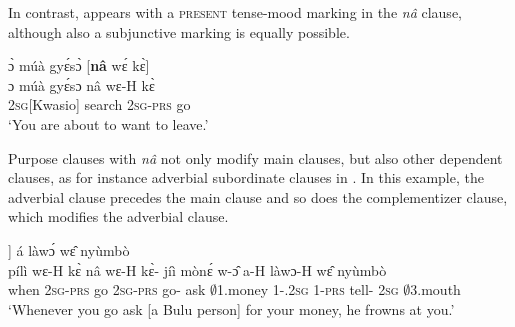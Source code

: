 In contrast,   appears with a \textsc{present} tense-mood marking in the {\itshape nâ} clause, although also a subjunctive marking is equally possible.


\ea\label{BComp3}
  \glll ɔ̀ múà gyɛ́sɔ̀ [{\bfseries nâ} wɛ́ kɛ̀]\textsubscript{{\COMP}} \\
       ɔ múà gyɛ́sɔ {\db}nâ wɛ-H kɛ̀ \\
         2\textsc{sg}[Kwasio] {\RETRO} search {\db}{\COMP} 2\textsc{sg}-\textsc{prs} go   \\
    \trans `You are about to want to leave.'
\z

Purpose clauses with {\itshape nâ} not only modify main clauses, but also other dependent clauses, as for instance adverbial subordinate clauses in . In this example, the adverbial clause precedes the main clause and so does the complementizer clause, which modifies the adverbial clause.



\ea\label{BComp5}
  \glll [pílì wɛ́ kɛ̀ [{\bfseries nâ}  wɛ́ kɛ́ jíì mònɛ́ wɔ̂]\textsubscript{{\COMP}}]\textsubscript{{\ADV}} á làwɔ́ wɛ̂ nyùmbò\\
        {\db}pílì wɛ-H kɛ̀ {\db}nâ  wɛ-H kɛ̀-{\R} jíì mònɛ́ w-ɔ̂ a-H làwɔ-H wɛ̂ nyùmbò\\
        {\db}when 2\textsc{sg}-\textsc{prs} go {\db}{\COMP} 2\textsc{sg}-\textsc{prs} go-{\R} ask $\emptyset$1.money 1-{\POSS}.2\textsc{sg} 1-\textsc{prs} tell-{\R} 2\textsc{sg} $\emptyset$3.mouth   \\
    \trans `Whenever you go ask [a Bulu person] for your money, he frowns at you.'
\z















